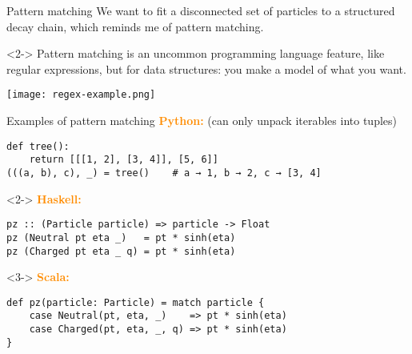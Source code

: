 \documentclass[aspectratio=169]{beamer}
\begin{document}
\begin{frame}{Pattern matching}
\Large
\vspace{0.35 cm}
We want to fit a disconnected set of particles to a structured decay chain, which reminds me of pattern matching.

\vspace{0.5 cm}
\large
\begin{uncoverenv}<2->
Pattern matching is an uncommon programming language feature, like regular expressions, but for data structures: you make a model of what you want.

\vspace{0.25 cm}
\begin{center}
\texttt{[image: regex-example.png]}
\end{center}
\end{uncoverenv}
\end{frame}

\begin{frame}[fragile]{Examples of pattern matching}
\Large
\vspace{0.25 cm}
\textcolor{darkorange}{\bf Python:} (can only unpack iterables into tuples)

\begin{center}
\begin{minipage}{0.85\linewidth}
\normalsize
\begin{verbatim}
def tree():
    return [[[1, 2], [3, 4]], [5, 6]]
(((a, b), c), _) = tree()    # a → 1, b → 2, c → [3, 4]
\end{verbatim}
\end{minipage}
\end{center}

\vspace{0.35 cm}
\begin{uncoverenv}<2->
\textcolor{darkorange}{\bf Haskell:}

\begin{center}
\begin{minipage}{0.85\linewidth}
\normalsize
\begin{verbatim}
pz :: (Particle particle) => particle -> Float
pz (Neutral pt eta _)   = pt * sinh(eta)
pz (Charged pt eta _ q) = pt * sinh(eta)
\end{verbatim}
\end{minipage}
\end{center}
\end{uncoverenv}

\vspace{0.35 cm}
\begin{uncoverenv}<3->
\textcolor{darkorange}{\bf Scala:}

\begin{center}
\begin{minipage}{0.85\linewidth}
\normalsize
\begin{verbatim}
def pz(particle: Particle) = match particle {
    case Neutral(pt, eta, _)    => pt * sinh(eta)
    case Charged(pt, eta, _, q) => pt * sinh(eta)
}
\end{verbatim}
\end{minipage}
\end{center}
\end{uncoverenv}
\end{frame}
\end{document}
